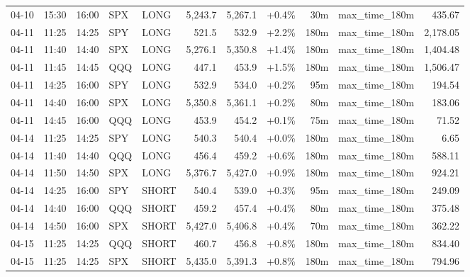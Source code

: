 \documentclass[11pt,a4paper,twoside]{article}
\begin{document}
\begin{center}
\begin{longtable}{>{\color{txtmain}}l l l l l r r r r >{\color{txtmain}}l r}
04-10 & 15:30 & 16:00 & SPX & LONG & 5,243.7 & 5,267.1 & \textcolor{wingreen}{+0.4\%} & 30m & max\_time\_180m & \textcolor{wingreen}{435.67} \\
04-11 & 11:25 & 14:25 & SPY & LONG & 521.5 & 532.9 & \textcolor{wingreen}{+2.2\%} & 180m & max\_time\_180m & \textcolor{wingreen}{2,178.05} \\
04-11 & 11:40 & 14:40 & SPX & LONG & 5,276.1 & 5,350.8 & \textcolor{wingreen}{+1.4\%} & 180m & max\_time\_180m & \textcolor{wingreen}{1,404.48} \\
04-11 & 11:45 & 14:45 & QQQ & LONG & 447.1 & 453.9 & \textcolor{wingreen}{+1.5\%} & 180m & max\_time\_180m & \textcolor{wingreen}{1,506.47} \\
04-11 & 14:25 & 16:00 & SPY & LONG & 532.9 & 534.0 & \textcolor{wingreen}{+0.2\%} & 95m & max\_time\_180m & \textcolor{wingreen}{194.54} \\
04-11 & 14:40 & 16:00 & SPX & LONG & 5,350.8 & 5,361.1 & \textcolor{wingreen}{+0.2\%} & 80m & max\_time\_180m & \textcolor{wingreen}{183.06} \\
04-11 & 14:45 & 16:00 & QQQ & LONG & 453.9 & 454.2 & \textcolor{wingreen}{+0.1\%} & 75m & max\_time\_180m & \textcolor{wingreen}{71.52} \\
04-14 & 11:25 & 14:25 & SPY & LONG & 540.3 & 540.4 & \textcolor{wingreen}{+0.0\%} & 180m & max\_time\_180m & \textcolor{wingreen}{6.65} \\
04-14 & 11:40 & 14:40 & QQQ & LONG & 456.4 & 459.2 & \textcolor{wingreen}{+0.6\%} & 180m & max\_time\_180m & \textcolor{wingreen}{588.11} \\
04-14 & 11:50 & 14:50 & SPX & LONG & 5,376.7 & 5,427.0 & \textcolor{wingreen}{+0.9\%} & 180m & max\_time\_180m & \textcolor{wingreen}{924.21} \\
04-14 & 14:25 & 16:00 & SPY & SHORT & 540.4 & 539.0 & \textcolor{wingreen}{+0.3\%} & 95m & max\_time\_180m & \textcolor{wingreen}{249.09} \\
04-14 & 14:40 & 16:00 & QQQ & SHORT & 459.2 & 457.4 & \textcolor{wingreen}{+0.4\%} & 80m & max\_time\_180m & \textcolor{wingreen}{375.48} \\
04-14 & 14:50 & 16:00 & SPX & SHORT & 5,427.0 & 5,406.8 & \textcolor{wingreen}{+0.4\%} & 70m & max\_time\_180m & \textcolor{wingreen}{362.22} \\
04-15 & 11:25 & 14:25 & QQQ & SHORT & 460.7 & 456.8 & \textcolor{wingreen}{+0.8\%} & 180m & max\_time\_180m & \textcolor{wingreen}{834.40} \\
04-15 & 11:25 & 14:25 & SPX & SHORT & 5,435.0 & 5,391.3 & \textcolor{wingreen}{+0.8\%} & 180m & max\_time\_180m & \textcolor{wingreen}{794.96} \\

\end{longtable}
\end{center}
\end{document}
